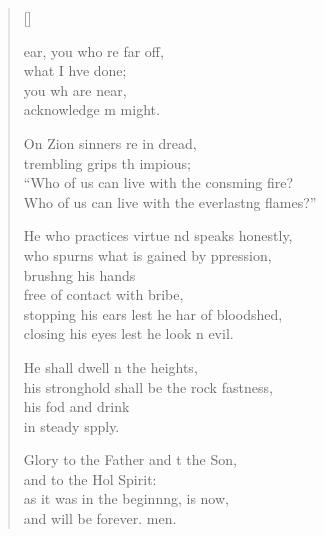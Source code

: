 \settowidth{\versewidth}{He who practices virtue and speaks honestly,}
\begin{verse}[\versewidth]
  \begin{patverse}
ear, you who re far off,\Med\\
what I hve done;\\
you wh are near,\Med\\
acknowledge m might.

On Zion sinners re in dread,\Med\\
trembling grips th impious;\\
“Who of us can live with the consming fire?\Med\\
Who of us can live with the everlast\pointup{\i}ng flames?”

He who practices virtue nd speaks honestly,\Med\\
who spurns what is gained by ppression,\\
brush\pointup{\i}ng his hands\Med\\
free of contact with  bribe,\\
stopping his ears lest he har of bloodshed,\Med\\
closing his eyes lest he look n evil.

He shall dwell n the heights,\Med\\
his stronghold shall be the rock fastness,\\
his fod and drink\Med\\
in steady spply.

Glory to the Father and t the Son,\Med\\
and to the Hol Spirit:\\
as it was in the beginn\pointup{\i}ng, is now,\Med\\
and will be forever. men. 
  \end{patverse}
\end{verse}
